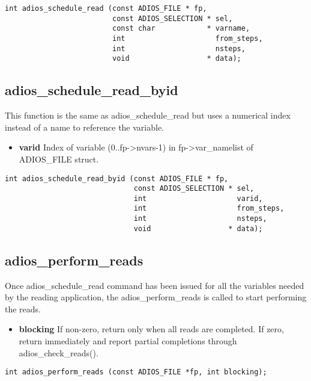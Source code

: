 \begin{lstlisting}[alsolanguage=C]
int adios_schedule_read (const ADIOS_FILE * fp,
                         const ADIOS_SELECTION * sel,
                         const char            * varname,
                         int                     from_steps,
                         int                     nsteps,
                         void                  * data);
\end{lstlisting}



\subsection{adios\_schedule\_read\_byid}
This function is the same as adios\_schedule\_read but uses a numerical index instead of a name to reference the variable. 

\begin{itemize}
\item{\bf varid} Index of variable (0..fp->nvars-1) in fp->var\_namelist of ADIOS\_FILE struct. 
\end{itemize}

\begin{lstlisting}[alsolanguage=C]
int adios_schedule_read_byid (const ADIOS_FILE * fp, 
                              const ADIOS_SELECTION * sel,
                              int                     varid,
                              int                     from_steps,
                              int                     nsteps,
                              void                  * data);
\end{lstlisting}



\subsection{adios\_perform\_reads}
Once adios\_schedule\_read command has been issued for all the variables needed by the reading application, the adios\_perform\_reads 
is called to start performing the reads. 
\begin{itemize}
\item{\bf blocking} If non-zero, return only when all reads are completed.
If zero, return immediately and report partial completions
through adios\_check\_reads(). 
\end{itemize}

\begin{lstlisting}[alsolanguage=C]
int adios_perform_reads (const ADIOS_FILE *fp, int blocking);
\end{lstlisting}



